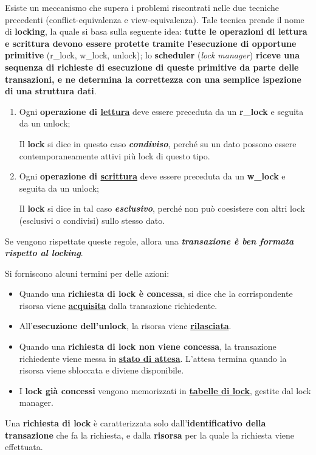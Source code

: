 \documentclass[a4paper]{article}
\begin{document}
	Esiste un meccanismo che supera i problemi riscontrati nelle due tecniche precedenti (conflict-equivalenza e view-equivalenza). Tale tecnica prende il nome di \textcolor{Red3}{\textbf{locking}}, la quale si basa sulla seguente idea: \textbf{tutte le operazioni di lettura e scrittura devono essere protette tramite l'esecuzione di opportune primitive} (\textsf{r\_lock}, \textsf{w\_lock}, \textsf{unlock}); lo \textbf{scheduler} (\emph{lock manager}) \textbf{riceve una sequenza di richieste di esecuzione di queste primitive da parte delle transazioni, e ne determina la correttezza con una semplice ispezione di una struttura dati}.
	\begin{enumerate}
		\item Ogni \textbf{operazione di \underline{lettura}} deve essere preceduta da un \textbf{\textsf{r\_lock}} e seguita da un \textsf{unlock};
		
		Il \textbf{lock} si dice in questo caso \textbf{\emph{condiviso}}, perché su un dato possono essere contemporaneamente attivi più lock di questo tipo.
		
		\item Ogni \textbf{operazione di \underline{scrittura}} deve essere preceduta da un \textbf{\textsf{w\_lock}} e seguita da un \textsf{unlock};
		
		Il \textbf{lock} si dice in tal caso \textbf{\emph{esclusivo}}, perché non può coesistere con altri lock (esclusivi o condivisi) sullo stesso dato.
	\end{enumerate}
	Se vengono rispettate queste regole, allora una \textbf{\emph{transazione è ben formata rispetto al locking}}.\newline
	
	\noindent
	Si forniscono alcuni termini per delle azioni:
	\begin{itemize}
		\item Quando una \textbf{richiesta di lock è concessa}, si dice che la corrispondente risorsa viene \textbf{\underline{acquisita}} dalla transazione richiedente.
		
		\item All'\textbf{esecuzione dell'unlock}, la risorsa viene \textbf{\underline{rilasciata}}.
		
		\item Quando una \textbf{richiesta di lock non viene concessa}, la transazione richiedente viene messa in \textbf{\underline{stato di attesa}}. L'attesa termina quando la risorsa viene sbloccata e diviene disponibile.
		
		\item I \textbf{lock già concessi} vengono memorizzati in \textbf{\underline{tabelle di lock}}, gestite dal lock manager.
	\end{itemize}
	Una \textbf{richiesta di lock} è caratterizzata solo dall'\textbf{identificativo della transazione} che fa la richiesta, e dalla \textbf{risorsa} per la quale la richiesta viene effettuata.\newpage
	
\end{document}
